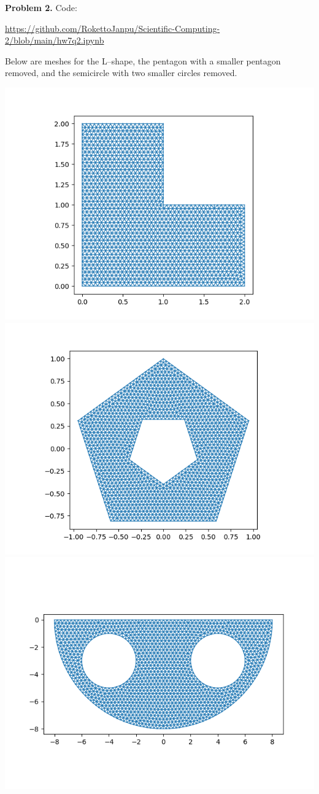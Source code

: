 \documentclass{article}
\def\tbf#1{\textbf{#1}}
\newcommand{\sep}[1][.5cm]{\vspace{#1}}
\begin{document}
\tbf{Problem 2.} Code:

\url{https://github.com/RokettoJanpu/Scientific-Computing-2/blob/main/hw7q2.ipynb}

Below are meshes for the L--shape, the pentagon with a smaller pentagon removed, and the semicircle with two smaller circles removed.

\includegraphics[scale=.35]{hw7 q2 shape 1}
\includegraphics[scale=.35]{hw7 q2 shape 2}
\includegraphics[scale=.35]{hw7 q2 shape 3}
\sep
\end{document}

